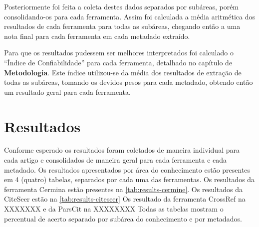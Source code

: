 Posteriormente foi feita a coleta destes dados separados por subáreas, porém consolidando-os para cada ferramenta. Assim foi calculada a média aritmética dos resultados de cada ferramenta para todas as subáreas, chegando então a uma nota final para cada ferramenta em cada metadado extraído.


Para que os resultados pudessem ser melhores interpretados foi calculado o ``Índice de Confiabilidade'' para cada ferramenta, detalhado no capítulo de \textbf{Metodologia}. Este índice utilizou-se da média dos resultados de extração de todas as subáreas, tomando os devidos pesos para cada metadado, obtendo então um resultado geral para cada ferramenta.


\section{Resultados}
\label{sec:results}


Conforme esperado os resultados foram coletados de maneira individual para cada artigo e consolidados de maneira geral para cada ferramenta e cada metadado. Os resultados apresentados por área do conhecimento estão presentes em 4 (quatro) tabelas, separados por cada uma das ferramentas. Os resultados da ferramenta Cermina estão presentes na \autoref{tab:results-cermine}. Os resultados da CiteSeer estão na \autoref{tab:results-citeseer} Os resultado da ferramenta CrossRef na XXXXXXX e da ParsCit na XXXXXXXX Todas as tabelas mostram o percentual de acerto separado por subárea do conhecimento e por metadados.

